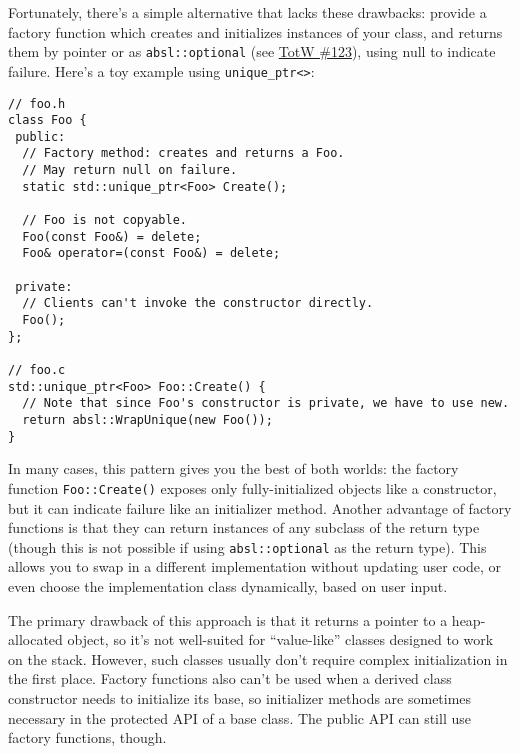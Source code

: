 Fortunately, there’s a simple alternative that lacks these drawbacks: provide a factory function which creates and initializes instances of your class, and returns them by pointer or as \texttt{absl::optional} (see \hyperref[ch:tip-of-the-week-123]{TotW \#123}), using null to indicate failure. Here’s a toy example using \texttt{unique_ptr<>}:

\begin{verbatim}
// foo.h
class Foo {
 public:
  // Factory method: creates and returns a Foo.
  // May return null on failure.
  static std::unique_ptr<Foo> Create();

  // Foo is not copyable.
  Foo(const Foo&) = delete;
  Foo& operator=(const Foo&) = delete;

 private:
  // Clients can't invoke the constructor directly.
  Foo();
};

// foo.c
std::unique_ptr<Foo> Foo::Create() {
  // Note that since Foo's constructor is private, we have to use new.
  return absl::WrapUnique(new Foo());
}
\end{verbatim}

In many cases, this pattern gives you the best of both worlds: the factory function \texttt{Foo::Create()} exposes only fully-initialized objects like a constructor, but it can indicate failure like an initializer method. Another advantage of factory functions is that they can return instances of any subclass of the return type (though this is not possible if using \texttt{absl::optional} as the return type). This allows you to swap in a different implementation without updating user code, or even choose the implementation class dynamically, based on user input.

The primary drawback of this approach is that it returns a pointer to a heap-allocated object, so it’s not well-suited for \enquote{value-like} classes designed to work on the stack. However, such classes usually don’t require complex initialization in the first place. Factory functions also can’t be used when a derived class constructor needs to initialize its base, so initializer methods are sometimes necessary in the protected API of a base class. The public API can still use factory functions, though.










